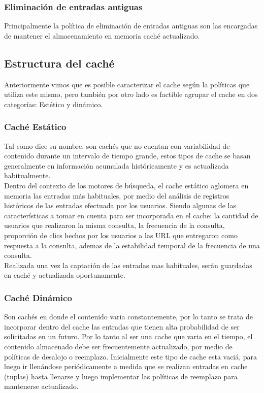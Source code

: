 \documentclass[12pt]{ociamthesis}  %
\begin{document}
\subsubsection{Eliminación de entradas antiguas}
Principalmente la política de eliminación de entradas antiguas son las encargadas de mantener el almacenamiento en memoria caché actualizado.\\ 

\subsection{Estructura del caché}
Anteriormente vimos que es posible caracterizar el cache según la políticas que utiliza este mismo, pero también por otro lado es factible agrupar el cache en dos categorías: Estético y dinámico.\\

\subsubsection{Caché Estático}
Tal como dice su nombre, son cachés que no cuentan con variabilidad de contenido durante un intervalo de tiempo grande, estos tipos de cache se basan generalmente en información acumulada históricamente y es actualizada habitualmente.\\

Dentro del contexto de los motores de búsqueda, el cache estático aglomera en memoria las entradas más habituales, por medio del análisis de registros históricos de las entradas efectuada por los usuarios. Siendo algunas de las características a tomar en cuenta para ser incorporada en el cache: la cantidad de usuarios que realizaron la misma consulta, la frecuencia de la consulta, proporción de clics hechos por los usuarios a las URL que entregaron como respuesta a la consulta, ademas de la estabilidad temporal de la frecuencia de una consulta.\\

Realizada una vez la captación de las entradas mas habituales, serán guardadas en caché y actualizada oportunamente.\\

\subsubsection{Caché Dinámico}
Son cachés en donde el contenido varia constantemente, por lo tanto se trata de incorporar dentro del cache las entradas que tienen alta probabilidad de ser solicitadas en un futuro. Por lo tanto al ser una cache que varia en el tiempo, el contenido almacenado debe ser frecuentemente actualizado, por medio de políticas de desalojo o reemplazo. Inicialmente este tipo de cache esta vaciá, para luego ir llenándose periódicamente a medida que se realizan entradas en cache (tuplas) hasta llenarse y luego implementar las políticas de reemplazo para mantenerse actualizado.\\
\end{document}
